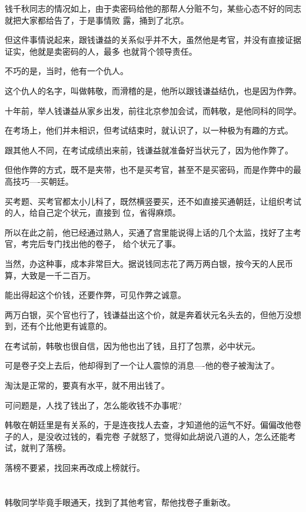 \documentclass[11pt,a4paper,onecolumn]{article}
\begin{document}
钱千秋同志的情况如上，由于卖密码给他的那帮人分赃不匀，某些心态不好的同志就把大家都给告了，于是事情败
露，捅到了北京。

但这件事情说起来，跟钱谦益的关系似乎并不大，虽然他是考官，并没有直接证据证实，他就是卖密码的人，最多
也就背个领导责任。

不巧的是，当时，他有一个仇人。

这个仇人的名字，叫做韩敬，而滑稽的是，他所以跟钱谦益结仇，也是因为作弊。

十年前，举人钱谦益从家乡出发，前往北京参加会试，而韩敬，是他同科的同学。

在考场上，他们并未相识，但考试结束时，就认识了，以一种极为有趣的方式。

跟其他人不同，在考试成绩出来前，钱谦益就准备好当状元了，因为他作弊了。

但他作弊的方式，既不是夹带，也不是买考官，甚至不是买密码，而是作弊中的最高技巧----买朝廷。

买考题、买考官都太小儿科了，既然横竖要买，还不如直接买通朝廷，让组织考试的人，给自己定个状元，直接到
位，省得麻烦。

所以在此之前，他已经通过熟人，买通了宫里能说得上话的几个太监，找好了主考官，考完后专门找出他的卷子，
给个状元了事。

当然，办这种事，成本非常巨大。据说钱同志花了两万两白银，按今天的人民币算，大致是一千二百万。

能出得起这个价钱，还要作弊，可见作弊之诚意。

两万白银，买个官也行了，钱谦益出这个价，就是奔着状元名头去的，但他万没想到，还有个比他更有诚意的。

在考试前，韩敬也很自信，因为他也出了钱，且打了包票，必中状元。

可是卷子交上去后，他却得到了一个让人震惊的消息----他的卷子被淘汰了。

淘汰是正常的，要真有水平，就不用出钱了。

可问题是，人找了钱出了，怎么能收钱不办事呢?

韩敬在朝廷里是有关系的，于是连夜找人去查，才知道他的运气不好。偏偏改他卷子的人，是没收过钱的，看完卷
子就怒了，觉得如此胡说八道的人，怎么还能考试，就判了落榜。

落榜不要紧，找回来再改成上榜就行。

\section[\thesection]{}

韩敬同学毕竟手眼通天，找到了其他考官，帮他找卷子重新改。
\end{document}
